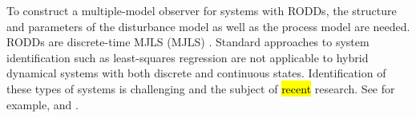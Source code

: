 {{To construct a multiple-model observer for systems with \gls{RODD}s, the structure and parameters of the disturbance model as well as the process model are needed. \gls{RODD}s are discrete-time \acrlong{MJLS} (\acrshort{MJLS}) \citep{costa_discrete-time_2005}. Standard approaches to system identification such as least-squares regression are not applicable to hybrid dynamical systems with both discrete and continuous states. Identification of these types of systems is challenging and the subject of \hl{recent} research. See for example, \cite{bemporad_fitting_2018} and \cite{piga_estimation_2020}.




}}
